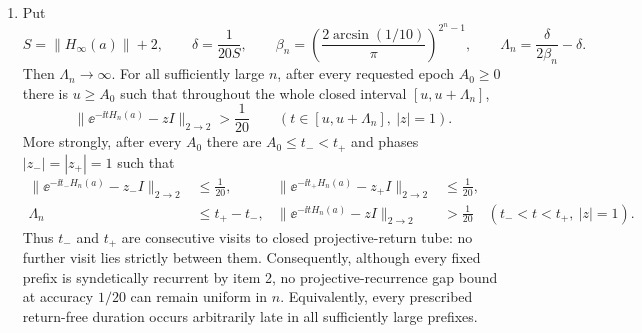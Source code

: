 \begin{theorem}
\begin{enumerate}[leftmargin=1.7em]
\begin{align}
                                                               \label{eq:samefieldUconv}\\
       \sup_{|t|\le T}\|\ee^{-\ii tH_n(a)}A\ee^{\ii tH_n(a)}
                    -\alpha_t(A)\|&\longrightarrow0              \label{eq:samefieldAconv}
      \end{align}
\item Put
      \begin{equation}
       S=\|H_\infty(a)\|+2,\qquad
       \delta=\frac1{20S},\qquad
       \beta_n=\left(\frac{2\arcsin(1/10)}{\pi}\right)^{2^n-1},
       \qquad
       \Lambda_n=\frac{\delta}{2\beta_n}-\delta .     \label{eq:desertscale}
      \end{equation}
      Then $\Lambda_n\to\infty$.  For all sufficiently large $n$, after
      every requested epoch $A_0\ge0$ there is $u\ge A_0$ such that
      throughout the whole closed interval $[u,u+\Lambda_n]$,
      \begin{equation}
       \|\ee^{-\ii tH_n(a)}-zI\|_{2\to2}>\frac1{20}
       \qquad(t\in[u,u+\Lambda_n],\ |z|=1).           \label{eq:samefielddesert}
      \end{equation}
      More strongly, after every $A_0$ there are $A_0\le t_-<t_+$ and
      phases $|z_-|=|z_+|=1$ such that
      \begin{align}
       \|\ee^{-\ii t_-H_n(a)}-z_-I\|_{2\to2}&\le\frac1{20},
       &\|\ee^{-\ii t_+H_n(a)}-z_+I\|_{2\to2}&\le\frac1{20},
                                                              \label{eq:samefieldgapends}\\
       \Lambda_n&\le t_+-t_-,
       &\|\ee^{-\ii tH_n(a)}-zI\|_{2\to2}&>\frac1{20}
       \quad(t_-<t<t_+,\ |z|=1).                 \label{eq:samefieldconsecutivegap}
      \end{align}
      Thus $t_-$ and $t_+$ are consecutive visits to closed projective-return
      tube: no further visit lies strictly between them.
      Consequently, although every fixed prefix is syndetically recurrent
      by item 2, no projective-recurrence gap bound at accuracy $1/20$ can
      remain uniform in $n$.  Equivalently, every prescribed return-free
      duration occurs arbitrarily late in all sufficiently large prefixes.
\end{enumerate}
\end{theorem}

